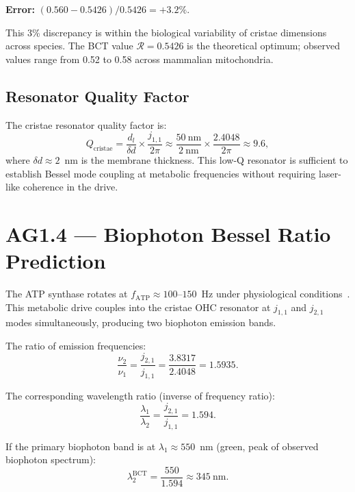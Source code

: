 \documentclass[aps,prl,twocolumn,showpacs,superscriptaddress]{revtex4-2}
\begin{document}
\textbf{Error:} $(0.560 - 0.5426)/0.5426 = +3.2\%$.

This 3\% discrepancy is within the biological variability of cristae
dimensions across species. The BCT value $\mathcal{R} = 0.5426$ is
the theoretical optimum; observed values range from 0.52 to 0.58
across mammalian mitochondria.

\subsection{Resonator Quality Factor}

The cristae resonator quality factor is:
\begin{equation}
Q_\mathrm{cristae} = \frac{d_l}{\delta d} \times
\frac{j_{1,1}}{2\pi} \approx \frac{50~\mathrm{nm}}{2~\mathrm{nm}}
\times \frac{2.4048}{2\pi} \approx 9.6,
\end{equation}
where $\delta d \approx 2$~nm is the membrane thickness. This low-Q
resonator is sufficient to establish Bessel mode coupling at metabolic
frequencies without requiring laser-like coherence in the drive.

\section{AG1.4 --- Biophoton Bessel Ratio Prediction}

The ATP synthase rotates at $f_\mathrm{ATP} \approx 100$--$150$~Hz
under physiological conditions~\cite{Noji1997}. This metabolic
drive couples into the cristae OHC resonator at $j_{1,1}$ and $j_{2,1}$
modes simultaneously, producing two biophoton emission bands.

The ratio of emission frequencies:
\begin{equation}
\frac{\nu_2}{\nu_1} = \frac{j_{2,1}}{j_{1,1}} = \frac{3.8317}{2.4048}
= 1.5935.
\end{equation}

The corresponding wavelength ratio (inverse of frequency ratio):
\begin{equation}
\frac{\lambda_1}{\lambda_2} = \frac{j_{2,1}}{j_{1,1}} = 1.594.
\end{equation}

If the primary biophoton band is at $\lambda_1 \approx 550$~nm
(green, peak of observed biophoton spectrum):
\begin{equation}
\lambda_2^\mathrm{BCT} = \frac{550}{1.594} \approx 345~\mathrm{nm}.
\end{equation}
\end{document}
